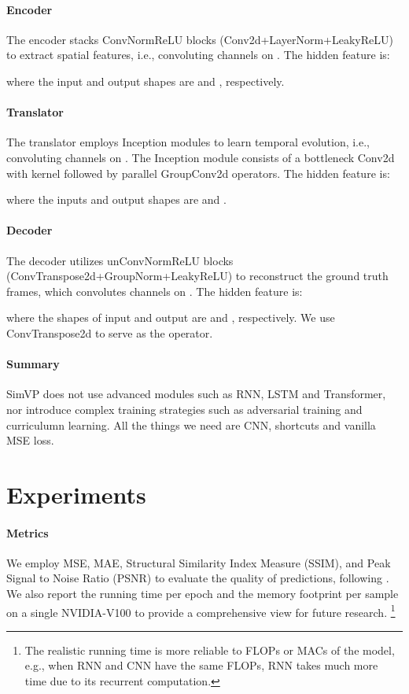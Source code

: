 \documentclass[10pt,twocolumn,letterpaper]{article}
\begin{document}
\paragraph{Encoder} The encoder stacks  ConvNormReLU blocks (Conv2d+LayerNorm+LeakyReLU) to extract spatial features, i.e., convoluting  channels on . The hidden feature is:

\vspace{-5mm}

where the input  and output  shapes are  and , respectively.


\paragraph{Translator} The translator employs  Inception modules to learn temporal evolution, i.e., convoluting  channels on . The Inception module consists of a bottleneck Conv2d with  kernel followed by parallel GroupConv2d operators. The hidden feature is:


where the inputs  and output  shapes are  and .


\paragraph{Decoder} The decoder utilizes  unConvNormReLU blocks (ConvTranspose2d+GroupNorm+LeakyReLU) to reconstruct the ground truth frames, which convolutes  channels on . The hidden feature is:


where the shapes of input  and output  are  and , respectively. We use ConvTranspose2d \cite{dumoulin2016guide} to serve as the  operator.

\paragraph{Summary} SimVP does not use advanced modules such as RNN, LSTM and Transformer, nor introduce complex training strategies such as adversarial training and curriculumn learning. All the things we need are CNN, shortcuts and vanilla MSE loss.

\section{Experiments}

\paragraph{Metrics} We employ MSE, MAE, Structural Similarity Index Measure (SSIM), and Peak Signal to Noise Ratio (PSNR) to evaluate the quality of predictions, following \cite{yu2019efficient,guen2020disentangling,oprea2020review}. We also report the running time per epoch and the memory footprint per sample on a single NVIDIA-V100 to provide a comprehensive view for future research. \footnote{The realistic running time is more reliable to FLOPs or MACs of the model, e.g., when RNN and CNN have the same FLOPs, RNN takes much more time due to its recurrent computation. }
\end{document}
